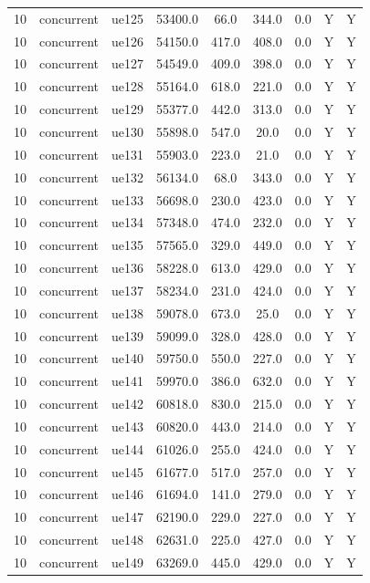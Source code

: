 \begin{table}[ht]
\begin{tabular}{|c|c|c|c|c|c|c|c|c|}
10 & concurrent & ue125 & 53400.0 & 66.0 & 344.0 & 0.0 & Y & Y \\
10 & concurrent & ue126 & 54150.0 & 417.0 & 408.0 & 0.0 & Y & Y \\
10 & concurrent & ue127 & 54549.0 & 409.0 & 398.0 & 0.0 & Y & Y \\
10 & concurrent & ue128 & 55164.0 & 618.0 & 221.0 & 0.0 & Y & Y \\
10 & concurrent & ue129 & 55377.0 & 442.0 & 313.0 & 0.0 & Y & Y \\
10 & concurrent & ue130 & 55898.0 & 547.0 & 20.0 & 0.0 & Y & Y \\
10 & concurrent & ue131 & 55903.0 & 223.0 & 21.0 & 0.0 & Y & Y \\
10 & concurrent & ue132 & 56134.0 & 68.0 & 343.0 & 0.0 & Y & Y \\
10 & concurrent & ue133 & 56698.0 & 230.0 & 423.0 & 0.0 & Y & Y \\
10 & concurrent & ue134 & 57348.0 & 474.0 & 232.0 & 0.0 & Y & Y \\
10 & concurrent & ue135 & 57565.0 & 329.0 & 449.0 & 0.0 & Y & Y \\
10 & concurrent & ue136 & 58228.0 & 613.0 & 429.0 & 0.0 & Y & Y \\
10 & concurrent & ue137 & 58234.0 & 231.0 & 424.0 & 0.0 & Y & Y \\
10 & concurrent & ue138 & 59078.0 & 673.0 & 25.0 & 0.0 & Y & Y \\
10 & concurrent & ue139 & 59099.0 & 328.0 & 428.0 & 0.0 & Y & Y \\
10 & concurrent & ue140 & 59750.0 & 550.0 & 227.0 & 0.0 & Y & Y \\
10 & concurrent & ue141 & 59970.0 & 386.0 & 632.0 & 0.0 & Y & Y \\
10 & concurrent & ue142 & 60818.0 & 830.0 & 215.0 & 0.0 & Y & Y \\
10 & concurrent & ue143 & 60820.0 & 443.0 & 214.0 & 0.0 & Y & Y \\
10 & concurrent & ue144 & 61026.0 & 255.0 & 424.0 & 0.0 & Y & Y \\
10 & concurrent & ue145 & 61677.0 & 517.0 & 257.0 & 0.0 & Y & Y \\
10 & concurrent & ue146 & 61694.0 & 141.0 & 279.0 & 0.0 & Y & Y \\
10 & concurrent & ue147 & 62190.0 & 229.0 & 227.0 & 0.0 & Y & Y \\
10 & concurrent & ue148 & 62631.0 & 225.0 & 427.0 & 0.0 & Y & Y \\
10 & concurrent & ue149 & 63269.0 & 445.0 & 429.0 & 0.0 & Y & Y \\

\end{tabular}
\end{table}
